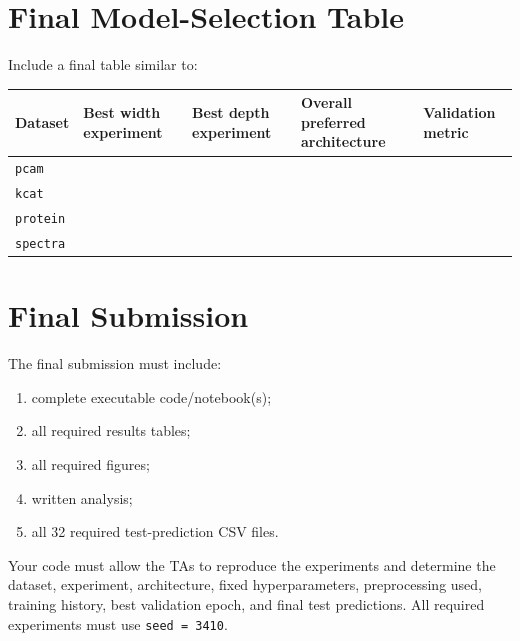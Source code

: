 \documentclass[11pt,a4paper]{article}
\newcommand{\code}[1]{\texttt{#1}}
\begin{document}
\section{Final Model-Selection Table}

Include a final table similar to:

\begin{center}
\small
\begin{tabular}{p{} p{} p{} p{} p{}}
\toprule
\textbf{Dataset} &
\textbf{Best width experiment} &
\textbf{Best depth experiment} &
\textbf{Overall preferred architecture} &
\textbf{Validation metric} \\
\midrule
\code{pcam} & & & & \\
\code{kcat} & & & & \\
\code{protein} & & & & \\
\code{spectra} & & & & \\
\bottomrule
\end{tabular}
\end{center}

\section{Final Submission}

The final submission must include:

\begin{enumerate}
    \item complete executable code/notebook(s);
    \item all required results tables;
    \item all required figures;
    \item written analysis;
    \item all 32 required test-prediction CSV files.
\end{enumerate}

Your code must allow the TAs to reproduce the experiments and determine the dataset, experiment, architecture, fixed hyperparameters, preprocessing used, training history, best validation epoch, and final test predictions. All required experiments must use \code{seed = 3410}.
\end{document}
